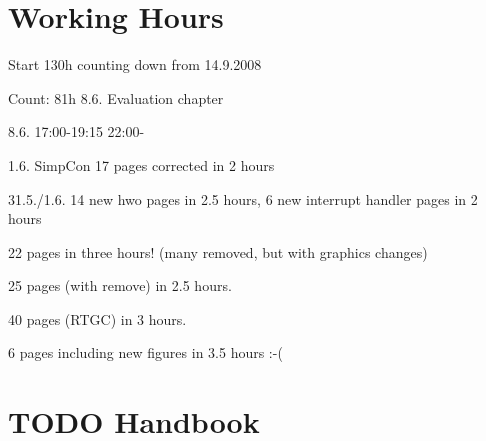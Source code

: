 \section{Working Hours}

Start 130h counting down from 14.9.2008

Count: 81h 8.6. Evaluation chapter

8.6. 17:00-19:15 22:00-



1.6. SimpCon 17 pages corrected in 2 hours

31.5./1.6. 14 new hwo pages in 2.5 hours, 6 new interrupt handler
pages in 2 hours

22 pages in three hours! (many removed, but with graphics changes)

25 pages (with remove) in 2.5 hours.

40 pages (RTGC) in 3 hours.

6 pages including new figures in 3.5 hours :-(

\section{TODO Handbook}

